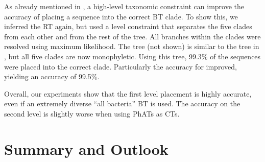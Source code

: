 As already mentioned in ,
a high-level taxonomic constraint can improve the accuracy of placing a sequence into the correct \ac{BT} clade.
To show this, we inferred the  \ac{RT} again,
but used a  level constraint
that separates the five clades from each other and from the rest of the tree.
All branches within the clades were resolved using maximum likelihood.
The tree (not shown) is similar to the tree in , but all five clades are now monophyletic.
Using this tree, 99.3\% of the sequences were placed into the correct clade.
Particularly the accuracy for  improved, yielding an accuracy of 99.5\%.


Overall, our experiments show that the first level placement is highly accurate,
even if an extremely diverse ``all bacteria'' \acl{BT} is used.
The accuracy on the second level is slightly worse when using \acp{PhAT} as \acp{CT}.



\section{Summary and Outlook}
\label{ch:AutomaticTrees:sec:SummaryOutlook}

